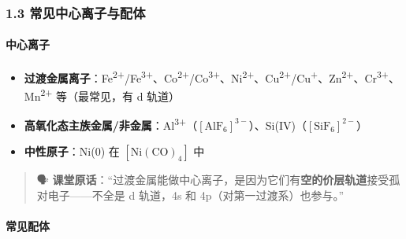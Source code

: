 \documentclass[a4paper,11pt]{ctexart}
\providecommand{\tightlist}{\setlength{\itemsep}{0pt}\setlength{\parskip}{0pt}}
\begin{document}
\subsubsection{1.3 常见中心离子与配体}\label{ux5e38ux89c1ux4e2dux5fc3ux79bbux5b50ux4e0eux914dux4f53}

\paragraph{中心离子}\label{ux4e2dux5fc3ux79bbux5b50}

\begin{itemize}
\tightlist
\item
  \textbf{过渡金属离子}：Fe\textsuperscript{2+}/Fe\textsuperscript{3+}、Co\textsuperscript{2+}/Co\textsuperscript{3+}、Ni\textsuperscript{2+}、Cu\textsuperscript{2+}/Cu\textsuperscript{+}、Zn\textsuperscript{2+}、Cr\textsuperscript{3+}、Mn\textsuperscript{2+} 等（最常见，有 d 轨道）
\item
  \textbf{高氧化态主族金属/非金属}：Al\textsuperscript{3+}（\([\mathrm{AlF_6}]^{3-}\)）、Si(IV)（\([\mathrm{SiF_6}]^{2-}\)）
\item
  \textbf{中性原子}：Ni(0) 在 \([\mathrm{Ni(CO)_4}]\) 中
\end{itemize}

\begin{quote}
🗣️ \textbf{课堂原话}：``过渡金属能做中心离子，是因为它们有\textbf{空的价层轨道}接受孤对电子------不全是 d 轨道，4s 和 4p（对第一过渡系）也参与。''
\end{quote}

\paragraph{常见配体}\label{ux5e38ux89c1ux914dux4f53}
\end{document}
